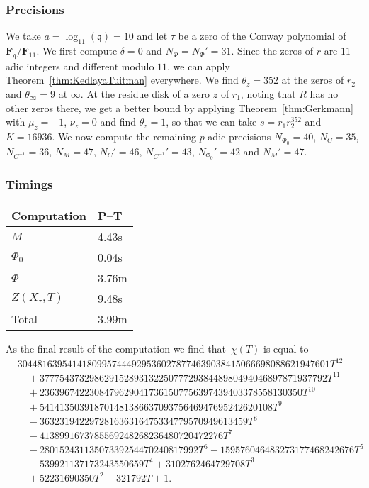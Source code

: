 \documentclass[a4paper,11pt]{article}
\numberwithin{equation}{section}
\newcommand{\FF}{\mathbf{F}} %
\theoremstyle{definition}
\begin{document}
\subsubsection{Precisions}

We take $a=\log_{11}(\mathfrak{q})=10$ and let $\tau$ be a zero of the Conway polynomial of 
$\FF_{\mathfrak{q}}/\FF_{11}$. 
We first compute $\delta=0$ and $N_{\Phi}=N_{\Phi}'=31$.
Since the zeros of $r$ are $11$-adic integers and different modulo $11$, we can apply 
Theorem~\ref{thm:KedlayaTuitman} everywhere. We find $\theta_z=352$ at the zeros of $r_2$
and $\theta_{\infty}=9$ at $\infty$. At the residue disk of a zero $z$ of $r_1$, noting that 
$R$ has no other zeros there, we get a better bound by applying 
Theorem~\ref{thm:Gerkmann} with $\mu_z=-1$, $\nu_z=0$ and find $\theta_z=1$, so that we can 
take $s=r_1 r_2^{352}$ and $K=16936$. We now compute the remaining $p$-adic precisions 
$N_{\Phi_0}=40$, $N_C=35$, $N_{C^{-1}}=36$, $N_M=47$, $N_C'=46$, $N_{C^{-1}}'=43$, 
$N_{\Phi_0}'=42$ and $N_M'=47$.

\subsubsection{Timings}

\begin{center}
\begin{tabular}{l l} \toprule
Computation     & P--T \\ \midrule
$M$             & 4.43s     \\
$\Phi_0$        & 0.04s     \\
$\Phi$          & 3.76m     \\
$Z(X_{\tau},T)$ & 9.48s     \\
Total           & 3.99m     \\ \bottomrule
\end{tabular}
\end{center}

\bigskip

As the final result of the computation we find that~$\chi(T)$ is equal to 
\begin{equation*}
\begin{split}
& 304481639541418099574449295360278774639038415066698088621947601 T^{12} \\
& \quad + 3777543732986291528931322507772938448980494046897871937792 T^{11} \\
& \quad + 23639674223084796290417361507756397439403378558130350 T^{10} \\ 
& \quad + 54141350391870148138663709375646947695242620108 T^9 \\
& \quad - 363231942297281636316475334779570949613459 T^8 \\
& \quad - 4138991673785569248268236480720472276 T^7 \\
& \quad - 28015243113507339254470240817992 T^6 - 159576046483273177468242676 T^5 \\ 
& \quad - 539921137173243550659 T^4 + 3102762464729708 T^3 \\
& \quad + 52231690350 T^2 + 321792 T + 1.
\end{split}
\end{equation*}
\end{document}
